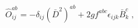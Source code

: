 \begin{equation}
\hat{O}_{ij}^{ab} = -\delta_{ij} (\bar{D}^{2} )^{ab} 
+ 2gf^{abc} \epsilon_{ijk} \bar{B}_{k}^{c}\;,
\label{opero}
\end{equation}

